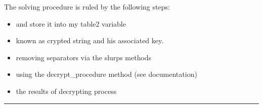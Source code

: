 \documentclass[letterpaper,10pt,english]{sphinxmanual}
\begin{document}
\sphinxAtStartPar
The solving procedure is ruled by the following steps:
\begin{itemize}
\item {} 
\sphinxAtStartPar
{} and store it into my table2 variable

\item {} 
\sphinxAtStartPar
{} known as crypted string and his associated key.

\item {} 
\sphinxAtStartPar
{} removing separators via the slurps methods

\item {} 
\sphinxAtStartPar
{} using the decrypt\_procedure method (see documentation)

\item {} 
\sphinxAtStartPar
{} the results of decrypting process

\end{itemize}


\bigskip\hrule\bigskip
\end{document}
